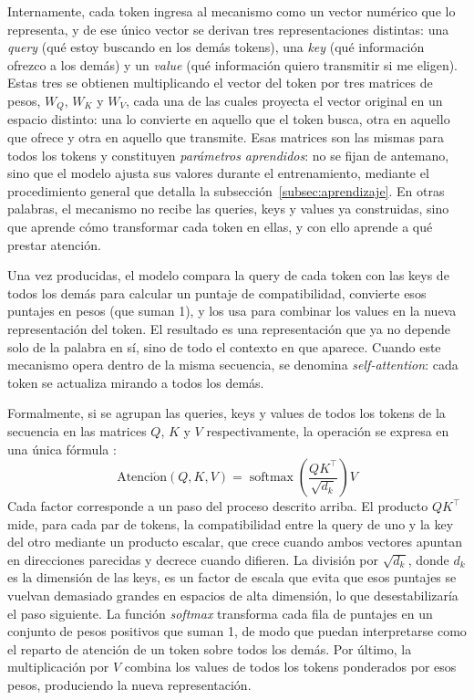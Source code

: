 Internamente, cada token ingresa al mecanismo como un vector numérico que lo representa, y de ese único vector se derivan tres representaciones distintas: una \textit{query} (qué estoy buscando en los demás tokens), una \textit{key} (qué información ofrezco a los demás) y un \textit{value} (qué información quiero transmitir si me eligen). Estas tres se obtienen multiplicando el vector del token por tres matrices de pesos, $W_Q$, $W_K$ y $W_V$, cada una de las cuales proyecta el vector original en un espacio distinto: una lo convierte en aquello que el token busca, otra en aquello que ofrece y otra en aquello que transmite. Esas matrices son las mismas para todos los tokens y constituyen \textit{parámetros aprendidos}: no se fijan de antemano, sino que el modelo ajusta sus valores durante el entrenamiento, mediante el procedimiento general que detalla la subsección~\ref{subsec:aprendizaje}. En otras palabras, el mecanismo no recibe las queries, keys y values ya construidas, sino que aprende cómo transformar cada token en ellas, y con ello aprende a qué prestar atención.

Una vez producidas, el modelo compara la query de cada token con las keys de todos los demás para calcular un puntaje de compatibilidad, convierte esos puntajes en pesos (que suman 1), y los usa para combinar los values en la nueva representación del token. El resultado es una representación que ya no depende solo de la palabra en sí, sino de todo el contexto en que aparece. Cuando este mecanismo opera dentro de la misma secuencia, se denomina \textit{self-attention}: cada token se actualiza mirando a todos los demás.

Formalmente, si se agrupan las queries, keys y values de todos los tokens de la secuencia en las matrices $Q$, $K$ y $V$ respectivamente, la operación se expresa en una única fórmula \parencite{vaswani_2017_attention}:
\begin{equation}
    \operatorname{Atenci\acute{o}n}(Q, K, V) = \operatorname{softmax}\!\left(\frac{Q K^{\top}}{\sqrt{d_k}}\right) V
    \label{eq:attention}
\end{equation}
\noindent Cada factor corresponde a un paso del proceso descrito arriba. El producto $Q K^{\top}$ mide, para cada par de tokens, la compatibilidad entre la query de uno y la key del otro mediante un producto escalar, que crece cuando ambos vectores apuntan en direcciones parecidas y decrece cuando difieren. La división por $\sqrt{d_k}$, donde $d_k$ es la dimensión de las keys, es un factor de escala que evita que esos puntajes se vuelvan demasiado grandes en espacios de alta dimensión, lo que desestabilizaría el paso siguiente. La función \textit{softmax} transforma cada fila de puntajes en un conjunto de pesos positivos que suman 1, de modo que puedan interpretarse como el reparto de atención de un token sobre todos los demás. Por último, la multiplicación por $V$ combina los values de todos los tokens ponderados por esos pesos, produciendo la nueva representación.


